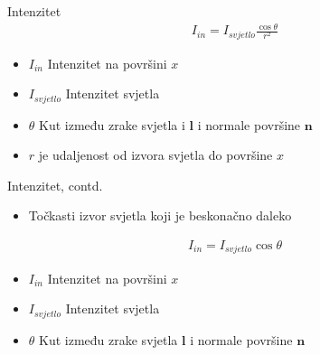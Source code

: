 \documentclass[9pt]{beamer}
\begin{document}
\begin{frame}{Intenzitet}
	\begin{align*}
	I_{in} = I_{svjetlo}\frac{\cos \theta}{r^2} 
	\end{align*}
	\begin{itemize}
		\item $I_{in}$ Intenzitet na površini $x$
		\item $I_{svjetlo}$ Intenzitet svjetla
		\item $\theta$ Kut između zrake svjetla i $\mathbf{l}$ i normale površine $\mathbf{n}$
		\item $r$ je udaljenost od izvora svjetla do površine $x$
	\end{itemize}
\end{frame}

\begin{frame}{Intenzitet, contd.}
	\begin{itemize}
		\item Točkasti izvor svjetla koji je \alert{beskonačno} daleko
	\end{itemize}
	\begin{align*}
	I_{in} = I_{svjetlo}\cos \theta
	\end{align*}
	\begin{itemize}
		\item $I_{in}$ Intenzitet na površini $x$
		\item $I_{svjetlo}$ Intenzitet svjetla
		\item $\theta$ Kut između zrake svjetla $\mathbf{l}$ i normale površine $\mathbf{n}$
	\end{itemize}
\end{frame}
\end{document}
